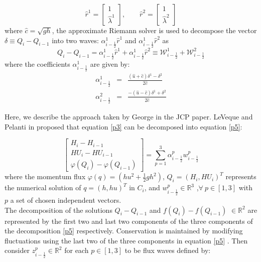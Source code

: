 \documentclass[12pt,a4paper]{article}
\begin{document}
	\begin{equation}
		\hat{r}^1 =  \begin{bmatrix} 1 \\ 	\hat{\lambda}^1 \end{bmatrix}, \qquad 	\hat{r}^2 =  
		\begin{bmatrix} 1 \\ 	\hat{\lambda}^2 \end{bmatrix}
		\label{vec}
	\end{equation}
	where $\hat{c} = \sqrt{gh}$, the approximate Riemann solver is used to decompose the vector  $ \delta \equiv Q_{i} - Q_{i-1}$ into two waves: $\alpha_{i-\frac{1}{2}}^{1} \hat{r}^1$ and $\alpha_{i-\frac{1}{2}}^{1} \hat{r}^2$ as 
	\begin{equation}
		Q_{i} - Q_{i-1} = \alpha_{i-\frac{1}{2}}^{1} \hat{r}^1 + \alpha_{i-\frac{1}{2}}^{1} \hat{r}^2 \equiv \mathcal{W}_{i-\frac{1}{2}}^{1} + \mathcal{W}_{i-\frac{1}{2}}^{2}
	\end{equation}
	where the coefficients $\alpha_{i-\frac{1}{2}}^{1}$ are given by:
	\begin{eqnarray}
		\alpha_{i-\frac{1}{2}}^{1} &=& \frac{(\hat{u} + \hat{c})\delta^{1} - \delta^2}{2\hat{c}}\\
		\alpha_{i-\frac{1}{2}}^{2} &=& \frac{-(\hat{u} - \hat{c})\delta^{1} + \delta^2}{2\hat{c}}
	\end{eqnarray}

	Here, we describe the approach taken by George in the JCP paper\cite{ge:2008}. LeVeque and Pelanti in \cite{leveque2001class} proposed that equation \eqref{p3} can be decomposed into equation \eqref{p5}:

	\begin{equation}
		\begin{bmatrix} 
			H_{i} - H_{i-1}\\ 	HU_{i} - HU_{i-1} \\  \varphi(Q_{i}) - \varphi(Q_{i-1}) 
		\end{bmatrix} = \sum_{p=1}^{3} \alpha_{i-\frac{1}{2}}^{p} w_{i-\frac{1}{2}}^{p}
		\label{p5}
	\end{equation}
	where the momentum flux $\varphi(q) = (hu^{2} + \frac{1}{2} gh^{2})$, $Q_{i} = (H_{i},HU_{i})^{T}$ represents the numerical solution of $q = (h,hu)^{T}$ in $C_{i}$, and $w_{i-\frac{1}{2}}^{p} \in \mathbb{R}^{3}$ ,$\forall ~ p \in [1,3] $ with $p$ a set of chosen independent vectors. \\
	
	The decomposition of the solutions $Q_{i} - Q_{i-1} $  and  $f(Q_{i}) - f(Q_{i-1})$ $ \in  \mathbb{R}^{2}$ are represented by the first two and last two components of the three components of the decomposition \eqref{p5} respectively.  Conservation is maintained by modifying fluctuations using the last two of the three components  in equation \eqref{p5} \cite{ba-le-mi-ro:2003}. Then  consider $z_{i-\frac{1}{2}}^{p} \in \mathbb{R}^{2}$ for each $p \in [1,3]$ to be flux waves defined by:
	
\end{document}
